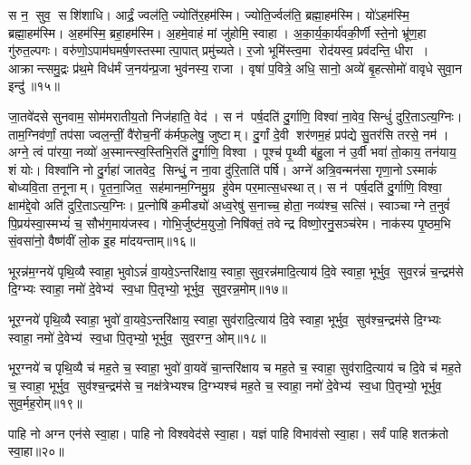 स न॒ सुव॒ सशि॑शाधि। आर्द्रं॒ ज्वल॑ति॒ ज्योति॑र॒हम॑स्मि। ज्योति॒र्ज्वल॑ति॒ ब्रह्मा॒हम॑स्मि। यो॑ऽहम॑स्मि॒ ब्रह्मा॒हम॑स्मि। अ॒हम॑स्मि॒ ब्रहा॒हम॑स्मि। अ॒हमे॒वाहं मां जु॑होमि॒ स्वाहा। अ॒का॒र्य॒का॒र्य॑वकी॒र्णी स्ते॒नो भ्रू॑ण॒हा गु॑रुत॒ल्पगः। वरु॑णो॒ऽपाम॑घ\-मर्\mbox{}ष॒णस्तस्मात्पा॒पात् प्रमु॑च्यते। र॒जो भूमि॑स्त्व॒मा रोद॑यस्व॒ प्रव॑दन्ति॒ धीरा। आक्रान्त्समु॒द्रः प्र॑थ॒मे विध॑र्मं ज॒नय॑न्प्र॒जा भुव॑नस्य॒ राजा। वृषा॑ प॒वित्रे॒ अधि॒ सानो॒ अव्ये॑ बृ॒हत्सोमो॑ वावृधे सुवा॒न इन्दु॑॥१५॥
\anuvakamend

 जा॒तवे॑दसे सुनवाम॒ सोम॑मरातीय॒तो निज॑हाति॒ वेद॑। स न॑ पर्\mbox{}ष॒दति॑ दु॒र्गाणि॒ विश्वा॑ ना॒वेव॒ सिन्धुं॑ दुरि॒ताऽत्य॒ग्निः। ताम॒ग्निव॑र्णां॒ तप॑सा ज्वल॒न्तीं॒ वै॑रोच॒नीं क॑र्मफ॒लेषु॒ जुष्टाम्। दु॒र्गां दे॒वी शर॑णम॒हं प्रप॑द्ये सु॒तर॑सि तरसे॒ नम॑। अग्ने॒ त्वं पा॑रया॒ नव्यो॑ अ॒स्मान्त्स्व॒स्तिभि॒रति॑ दु॒र्गाणि॒ विश्वा। पूश्च॑ पृ॒थ्वी ब॑हु॒ला न॑ उ॒र्वी भवा॑ तो॒काय॒ तन॑याय॒ शं योः। विश्वा॑नि नो दु॒र्गहा॑ जातवेद॒ सिन्धुं॒ न ना॒वा दु॑रि॒ताति॑ पर्\mbox{}षि। अग्ने॑ अत्रि॒वन्मन॑सा गृणा॒नोऽस्माकं॑ बोध्यवि॒ता त॒नूनाम्। पृ॒त॒ना॒जित॒ सह॑मानम॒ग्निमु॒ग्र हु॑वेम पर॒मात्स॒धस्थात्। स न॑ पर्\mbox{}ष॒दति॑ दु॒र्गाणि॒ विश्वा॒ क्षाम॑द्दे॒वो अति॑ दुरि॒ताऽत्य॒ग्निः। प्र॒त्नोषि॑ क॒मीड्यो॑ अध्व॒रेषु॑ स॒नाच्च॒ होता॒ नव्य॑श्च॒ सत्सि॑। स्वाञ्चाग्ने त॒नुवं॑ पि॒प्रय॑स्वा॒स्मभ्यं॑ च॒ सौभ॑ग॒माय॑जस्व। गोभि॒र्जुष्ट॑म॒युजो॒ निषि॑क्तं॒ तवेन्द्र विष्णो॒रनु॒सञ्च॑रेम। नाक॑स्य पृ॒ष्ठम॒भि सं॒वसा॑नो॒ वैष्ण॑वीं लो॒क इ॒ह मा॑दयन्ताम्॥१६॥
\anuvakamend%


भूरन्न॑म॒ग्नये॑ पृथि॒व्यै स्वाहा॒ भुवोऽन्नं॑ वा॒यवे॒ऽन्तरि॑क्षाय॒ स्वाहा॒ सुव॒रन्न॑मादि॒त्याय॑ दि॒वे स्वाहा॒ भूर्भुव॒ सुव॒रन्नं॑ च॒न्द्रम॑से दि॒ग्भ्यः स्वाहा॒ नमो॑ दे॒वेभ्य॑ स्व॒धा पि॒तृभ्यो॒ भूर्भुव॒ सुव॒रन्न॒मोम्॥१७॥
\anuvakamend

भूर॒ग्नये॑ पृथि॒व्यै स्वाहा॒ भुवो॑ वा॒यवे॒ऽन्तरि॑क्षाय॒ स्वाहा॒ सुव॑रादि॒त्याय॑ दि॒वे स्वाहा॒ भूर्भुव॒ सुव॑श्च॒न्द्रम॑से दि॒ग्भ्यः स्वाहा॒ नमो॑ दे॒वेभ्य॑ स्व॒धा पि॒तृभ्यो॒ भूर्भुव॒ सुव॒रग्न॒ ओम्॥१८॥
\anuvakamend

भूर॒ग्नये॑ च पृथि॒व्यै च॑ मह॒ते च॒ स्वाहा॒ भुवो॑ वा॒यवे॑ चा॒न्तरि॑क्षाय च मह॒ते च॒ स्वाहा॒ सुव॑रादि॒त्याय॑ च दि॒वे च॑ मह॒ते च॒ स्वाहा॒ भूर्भुव॒ सुव॑श्च॒न्द्रम॑से च॒ नक्ष॑त्रेभ्यश्च दि॒ग्भ्यश्च॑ मह॒ते च॒ स्वाहा॒ नमो॑ दे॒वेभ्य॑ स्व॒धा पि॒तृभ्यो॒ भूर्भुव॒ सुव॒र्मह॒रोम्॥१९॥ %
\anuvakamend

पाहि नो अग्न एन॑से स्वा॒हा। पाहि नो विश्ववेद॑से स्वा॒हा। यज्ञं पाहि विभाव॑सो स्वा॒हा। सर्वं पाहि शतक्र॑तो स्वा॒हा॥२०॥
\anuvakamend


